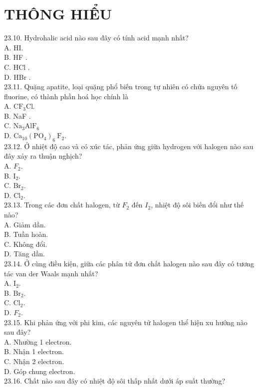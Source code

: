 \documentclass[10pt]{article}
\begin{document}
\section*{THÔNG HIỂU}
23.10. Hydrohalic acid nào sau đây có tính acid mạnh nhất?\\
A. HI.\\
B. HF .\\
C. HCl .\\
D. HBr .\\
23.11. Quặng apatite, loại quặng phổ biến trong tự nhiên có chứa nguyên tố fluorine, có thành phần hoá học chính là\\
A. $\mathrm{CF}_{3} \mathrm{Cl}$.\\
B. NaF .\\
C. $\mathrm{Na}_{3} \mathrm{AlF}_{6}$\\
D. $\mathrm{Ca}_{10}\left(\mathrm{PO}_{4}\right)_{6} \mathrm{~F}_{2}$.\\
23.12. Ở nhiệt độ cao và có xúc tác, phản ứng giữa hydrogen với halogen nào sau đây xảy ra thuận nghịch?\\
A. $F_{2}$.\\
B. $\mathrm{I}_{2}$.\\
C. $\mathrm{Br}_{2}$.\\
D. $\mathrm{Cl}_{2}$.\\
23.13. Trong các đơn chất halogen, từ $F_{2}$ đến $I_{2}$, nhiệt độ sôi biến đổi như thế nào?\\
A. Giảm dần.\\
B. Tuần hoàn.\\
C. Không đổi.\\
D. Tăng dần.\\
23.14. Ở cùng điều kiện, giữa các phân tử đơn chất halogen nào sau đây có tương tác van der Waals mạnh nhất?\\
A. $\mathrm{I}_{2}$.\\
B. $\mathrm{Br}_{2}$.\\
C. $\mathrm{Cl}_{2}$.\\
D. $F_{2}$.\\
23.15. Khi phản ứng với phi kim, các nguyên tử halogen thể hiện xu hướng nào sau đây?\\
A. Nhường 1 electron.\\
B. Nhận 1 electron.\\
C. Nhận 2 electron.\\
D. Góp chung electron.\\
23.16. Chất nào sau đây có nhiệt độ sôi thấp nhất dưới áp suất thường?\\
\end{document}
